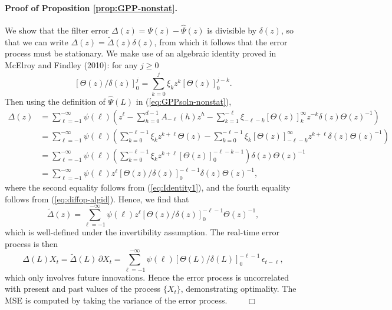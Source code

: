 \documentclass[a4paper]{book}
\begin{document}
\paragraph{Proof of Proposition \ref{prop:GPP-nonstat}.} 
 We show that the filter error $\Delta (z) = \Psi (z) - \widehat{\Psi} (z)$
  is divisible by $\delta (z)$, so that we can write
   $\Delta (z) = \widetilde{\Delta} (z) \delta (z)$, from which it follows
    that the error process must be stationary.
  We make use of an algebraic identity proved in McElroy and Findley (2010):
  for any $j \geq 0$
\begin{equation}
 \label{eq:diffop-algid}
  {[ \Theta (z)/ \delta (z)]}_0^{j} = \sum_{k=0}^j \xi_k z^k { [ \Theta (z) ] }_0^{j-k}.
\end{equation}
 Then using the definition of $\widehat{\Psi}(L)$ in (\ref{eq:GPPsoln-nonstat}),
\begin{align*}    
  \Delta (z) & =  \sum_{\ell = -1}^{- \infty} \psi (\ell) 
   \left( z^{\ell} - \sum_{h=0}^{d-1} A_{-\ell} (h) z^h  - \sum_{k=1}^{-\ell} \xi_{-\ell-k}
    {[ \Theta (z)]}_k^{\infty} z^{-k} \delta (z) { \Theta (z)}^{-1}  \right) \\
    & = \sum_{\ell = -1}^{- \infty} \psi (\ell) 
   \left( \sum_{k=0}^{-\ell-1} \xi_k z^{k+\ell} \Theta (z) -
     \sum_{k=0}^{-\ell-1} \xi_{k}
    {[ \Theta (z)]}_{-\ell-k}^{\infty} z^{k+\ell} \delta (z) { \Theta (z)}^{-1} \right) \\
  & = \sum_{\ell = -1}^{- \infty} \psi (\ell) 
   \left( \sum_{k=0}^{-\ell-1} \xi_k z^{k+\ell} 
    {[ \Theta (z)]}_0^{-\ell-k-1}   \right) \delta (z) { \Theta (z)}^{-1} \\
   & = \sum_{\ell = -1}^{- \infty} \psi (\ell) z^{\ell}
    { [ \Theta (z) / \delta (z)]}_0^{-\ell-1} 
    \delta (z) { \Theta (z)}^{-1},
\end{align*}    
   where the second equality follows from (\ref{eq:Identity1}), 
    and the fourth equality  follows from (\ref{eq:diffop-algid}).
    Hence, we find that
\[
 \widetilde{\Delta} (z) = \sum_{\ell = -1}^{- \infty} \psi (\ell) z^{\ell}
    { [ \Theta (z) / \delta (z)]}_0^{-\ell-1}  { \Theta (z)}^{-1},
\]
 which is well-defined under the invertibility assumption.  
 The real-time error process is then
\[
  \Delta (L) X_t = \widetilde{\Delta} (L) \, \partial X_t
    = \sum_{\ell = -1}^{- \infty} \psi (\ell)  
    { [ \Theta (L) / \delta (L)]}_0^{-\ell-1}\, \epsilon_{t-\ell},
\]
 which only involves future innovations.  Hence the error process is 
  uncorrelated with present and past values of the process $\{ X_t \}$,
   demonstrating optimality.  The MSE is computed 
 by taking the variance of the error process.  $\qquad \Box$
\end{document}
